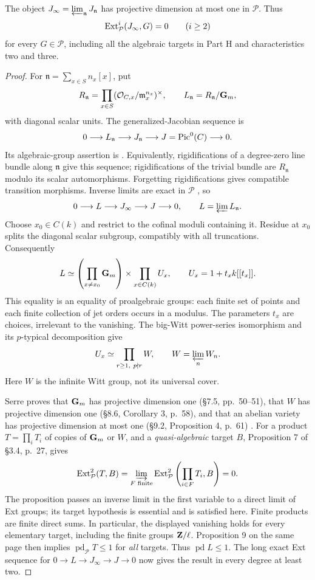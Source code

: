 \begin{theorem}\label{h:vanishing}
The object $J_\infty=\varprojlim_{\mathfrak n}J_{\mathfrak n}$ has
projective dimension at most one in $\mathcal P$. Thus
\[
 \operatorname{Ext}^i_{\mathcal P}(J_\infty,G)=0\qquad(i\geq2)
\]
for every $G\in\mathcal P$, including all the algebraic targets in Part H
and characteristics two and three.
\end{theorem}
\begin{proof}
For $\mathfrak n=\sum_{x\in S}n_x[x]$, put
\[
 R_{\mathfrak n}=\prod_{x\in S}
  (\mathcal O_{C,x}/\mathfrak m_x^{n_x})^\times,
 \qquad L_{\mathfrak n}=R_{\mathfrak n}/\mathbf G_m,
\]
with diagonal scalar units. The generalized-Jacobian sequence is
\[
 0\longrightarrow L_{\mathfrak n}\longrightarrow J_{\mathfrak n}
 \longrightarrow J=\operatorname{Pic}^0(C)\longrightarrow0.
\]
Its algebraic-group assertion is \cite[Chapter I, \S1, Theorem 3,
p.~12]{SerreGACC}. Equivalently, rigidifications of a degree-zero line
bundle along $\mathfrak n$ give this sequence; rigidifications of the
trivial bundle are $R_{\mathfrak n}$ modulo its scalar automorphisms.
Forgetting rigidifications gives compatible transition morphisms.
Inverse limits are exact in $\mathcal P$
\cite[\S2.5, Proposition 10, p.~19]{Serre1960}, so
\[
 0\longrightarrow L\longrightarrow J_\infty\longrightarrow J
 \longrightarrow0,\qquad L=\varprojlim L_{\mathfrak n}.
\]
Choose $x_0\in C(k)$ and restrict to the cofinal moduli containing it.
Residue at $x_0$ splits the diagonal scalar subgroup, compatibly with
all truncations. Consequently
\[
 L\simeq
 \left(\prod_{x\ne x_0}\mathbf G_m\right)
 \times\prod_{x\in C(k)}U_x,
 \qquad U_x=1+t_x k[[t_x]].
\]
This equality is an equality of proalgebraic groups: each finite set of
points and each finite collection of jet orders occurs in a modulus.
The parameters $t_x$ are choices, irrelevant to the vanishing.
The big-Witt power-series isomorphism and its $p$-typical decomposition
\cite[Propositions 1.14 and 1.10, pp.~11 and 8]{HesselholtWitt} give
\[
 U_x\simeq\prod_{r\geq1,\ p\nmid r}W,
 \qquad W=\varprojlim_n W_n.
\]
Here $W$ is the infinite Witt group, not its universal cover.

Serre proves that $\mathbf G_m$ has projective dimension one (\S7.5,
pp.~50--51), that $W$ has projective dimension one (\S8.6,
Corollary 3, p.~58), and that an abelian variety has projective dimension
at most one (\S9.2, Proposition 4, p.~61) \cite{Serre1960}.
For a product $T=\prod_i T_i$ of copies of $\mathbf G_m$ or $W$, and a
\emph{quasi-algebraic} target $B$, Proposition 7 of \S3.4, p.~27, gives
\[
 \operatorname{Ext}^2_{\mathcal P}(T,B)
 =\varinjlim_{F\text{ finite}}
  \operatorname{Ext}^2_{\mathcal P}\left(\prod_{i\in F}T_i,B\right)=0.
\]
The proposition passes an inverse limit in the first variable to a
direct limit of Ext groups; its target hypothesis is essential and is
satisfied here. Finite products are finite direct sums. In particular,
the displayed vanishing holds for every elementary target, including
the finite groups $\mathbf Z/\ell$. Proposition 9 on the same page then
implies $\operatorname{pd}_{\mathcal P}T\leq1$ for \emph{all} targets.
Thus $\operatorname{pd}L\leq1$. The long exact Ext sequence for
$0\to L\to J_\infty\to J\to0$ now gives the result in every degree
at least two.
\end{proof}

